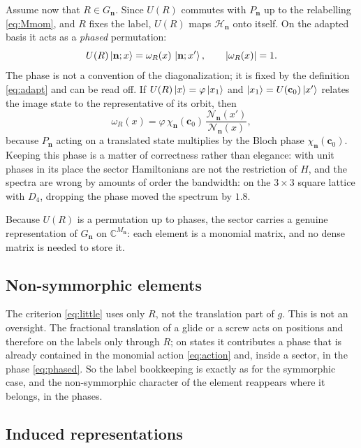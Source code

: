 \documentclass[12pt]{article}
\newcommand{\Hil}{\mathscr{H}}
\newcommand{\Gk}{G_{\mathbf{n}}}
\begin{document}
Assume now that $R \in \Gk$. Since $U(R)$ commutes with $P_{\mathbf{n}}$ up to the
relabelling \eqref{eq:Mmom}, and $R$ fixes the label, $U(R)$ maps
$\Hil_{\mathbf{n}}$ onto itself. On the adapted basis it acts as a \emph{phased}
permutation:
\begin{equation}
  U(R)\ket{\mathbf{n};x} = \omega_{R}(x)\,\ket{\mathbf{n};x'}, \qquad
  |\omega_R(x)| = 1 .
  \label{eq:phased}
\end{equation}
The phase is not a convention of the diagonalization; it is fixed by the
definition \eqref{eq:adapt} and can be read off. If $U(R)\ket{x} =
\varphi\ket{x_1}$ and $\ket{x_1} = U(\mathbf{c}_0)\ket{x'}$ relates the image
state to the representative of its orbit, then
\begin{equation}
  \omega_R(x) = \varphi\,\chi_{\mathbf{n}}(\mathbf{c}_0)\,
  \frac{\mathcal{N}_{\mathbf{n}}(x')}{\mathcal{N}_{\mathbf{n}}(x)} ,
\end{equation}
because $P_{\mathbf{n}}$ acting on a translated state multiplies by the Bloch
phase $\chi_{\mathbf{n}}(\mathbf{c}_0)$. Keeping this phase is a matter of
correctness rather than elegance: with unit phases in its place the sector
Hamiltonians are not the restriction of $H$, and the spectra are wrong by
amounts of order the bandwidth: on the $3\times3$ square lattice with $D_4$,
dropping the phase moved the spectrum by $1.8$.

Because $U(R)$ is a permutation up to phases, the sector carries a genuine
representation of $\Gk$ on $\mathbb{C}^{M_{\mathbf{n}}}$: each element is a
monomial matrix, and no dense matrix is needed to store it.

\subsection{Non-symmorphic elements}

The criterion \eqref{eq:little} uses only $R$, not the translation part of $g$.
This is not an oversight. The fractional translation of a glide or a screw acts
on positions and therefore on the labels only through $R$; on states it
contributes a phase that is already contained in the monomial action
\eqref{eq:action} and, inside a sector, in the phase \eqref{eq:phased}. So the
label bookkeeping is exactly as for the symmorphic case, and the non-symmorphic
character of the element reappears where it belongs, in the phases.

\subsection{Induced representations}\label{sec:induced}
\end{document}
